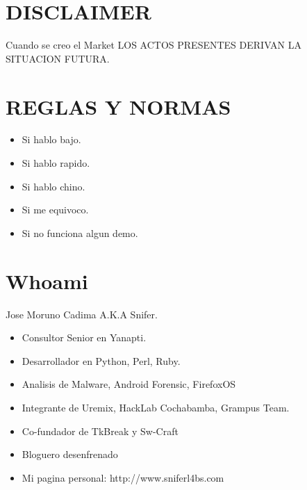 \documentclass[12pt]{beamer} %
\date{Jornada de Seguridad Informática  - Septiembre  2014} %
\begin{document}
\section{DISCLAIMER}

\begin{slide}

  \begin{alertblock}{Cuando se creo el Market}
     LOS ACTOS PRESENTES DERIVAN LA SITUACION FUTURA.

  \end{alertblock}

\end{slide}

\section{REGLAS Y NORMAS}

\begin{slide}


  \begin{itemize}
  \item Si hablo bajo.\pause
  \item Si hablo rapido. \pause
  \item Si hablo chino.\pause
  \item Si me equivoco.\pause
  \item Si no funciona algun demo.
  \end{itemize}
\end{slide}


\section{Whoami}

\begin{slide}
  
   \begin{center}
       Jose Moruno Cadima A.K.A Snifer.
   \end{center}
  
  \begin{itemize}
  \item Consultor Senior en Yanapti.\pause
  \item Desarrollador en Python, Perl, Ruby.\pause
  \item Analisis de Malware, Android Forensic, FirefoxOS \pause
  \item Integrante de Uremix, HackLab Cochabamba, Grampus Team.\pause
  \item Co-fundador de TkBreak y Sw-Craft
  \item Bloguero desenfrenado
  \item Mi pagina personal: http://www.sniferl4bs.com
  \end{itemize}
\end{slide}
\end{document}
